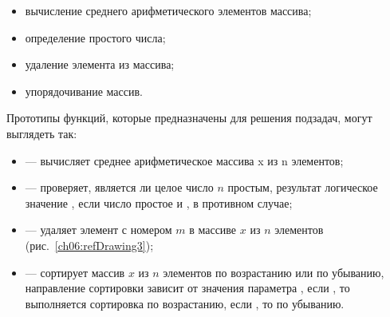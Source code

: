 \begin{itemize}
\item вычисление среднего арифметического элементов массива;
\item определение простого числа;
\item удаление элемента из массива;
\item упорядочивание массив.
\end{itemize}

Прототипы функций, которые предназначены для решения подзадач, могут выглядеть так:

\begin{itemize}
\item {} --- вычисляет среднее арифметическое массива x из n элементов;
\item {} --- проверяет, является ли целое число $n$ простым, результат логическое значение
, если число простое и , в противном случае;
\item {} --- удаляет элемент с номером $m$ в массиве $x$ из $n$ элементов (рис.~\ref{ch06:refDrawing3});%
\item {} --- сортирует массив $x$ из $n$ элементов
по возрастанию или по убыванию, направление сортировки зависит от значения параметра , если
, то выполняется сортировка по возрастанию, если , то по убыванию.
\end{itemize}

